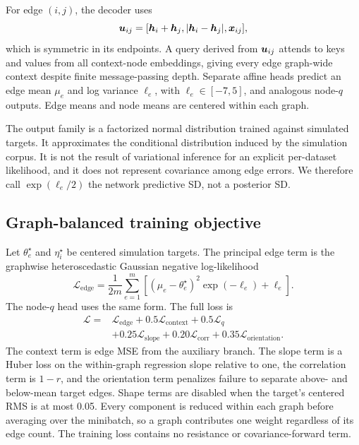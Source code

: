 For edge $(i,j)$, the decoder uses
\begin{equation}
    \boldsymbol{u}_{ij}
    =
    [\boldsymbol{h}_i+\boldsymbol{h}_j,
      |\boldsymbol{h}_i-\boldsymbol{h}_j|,
      \boldsymbol{x}_{ij}],
\end{equation}
which is symmetric in its endpoints. A query derived from $\boldsymbol{u}_{ij}$
attends to keys and values from all context-node embeddings, giving every edge
graph-wide context despite finite message-passing depth. Separate affine heads
predict an edge mean $\mu_e$ and log variance $\ell_e$, with
$\ell_e\in[-7,5]$, and analogous node-$q$ outputs. Edge means and node means
are centered within each graph.

The output family is a factorized normal distribution trained against
simulated targets. It approximates the conditional distribution induced by
the simulation corpus. It is not the result of variational inference for an
explicit per-dataset likelihood, and it does not represent covariance among
edge errors. We therefore call $\exp(\ell_e/2)$ the network predictive SD, not
a posterior SD.

\begin{table}[t]
\centering
\caption{Model and optimization settings for the production checkpoint.}
\label{tab:model-setup}
\small

\end{table}

\subsection{Graph-balanced training objective}

Let $\theta_e^\star$ and $\eta_i^\star$ be centered simulation targets. The
principal edge term is the graphwise heteroscedastic Gaussian negative
log-likelihood
\begin{equation}
    \mathcal L_{\mathrm{edge}}
    =\frac{1}{2m}\sum_{e=1}^m
    \left[(\mu_e-\theta_e^\star)^2\exp(-\ell_e)+\ell_e\right].
    \label{eq:edge-nll}
\end{equation}
The node-$q$ head uses the same form. The full loss is
\begin{equation}
 \begin{split}
    \mathcal L={}&
    \mathcal L_{\mathrm{edge}}
    +0.5\mathcal L_{\mathrm{context}}
    +0.5\mathcal L_q\\
    &+0.25\mathcal L_{\mathrm{slope}}
    +0.20\mathcal L_{\mathrm{corr}}
    +0.35\mathcal L_{\mathrm{orientation}}.
 \end{split}
 \label{eq:total-loss}
\end{equation}
The context term is edge MSE from the auxiliary branch. The slope term is a
Huber loss on the within-graph regression slope relative to one, the
correlation term is $1-r$, and the orientation term penalizes failure to
separate above- and below-mean target edges. Shape terms are disabled when the
target's centered RMS is at most 0.05. Every component is reduced within each
graph before averaging over the minibatch, so a graph contributes one weight
regardless of its edge count. The training loss contains no resistance or
covariance-forward term.

